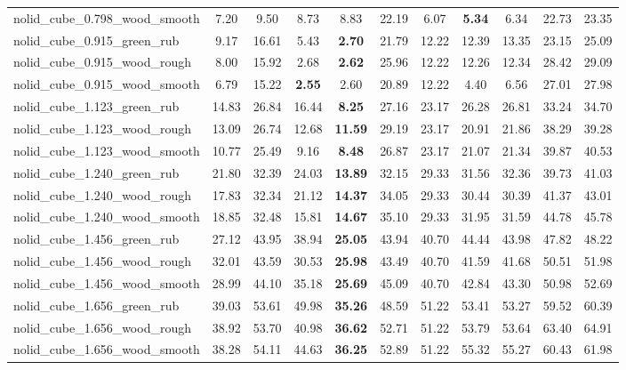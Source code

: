 \begin{table}[H]
{\begin{tabular}{l cccccccccc}
        nolid\_cube\_0.798\_wood\_smooth & 7.20 & 9.50 & 8.73 & 8.83 & 22.19 & 6.07 & \textbf{5.34} & 6.34 & 22.73 & 23.35 \\
        nolid\_cube\_0.915\_green\_rub & 9.17 & 16.61 & 5.43 & \textbf{2.70} & 21.79 & 12.22 & 12.39 & 13.35 & 23.15 & 25.09 \\
        nolid\_cube\_0.915\_wood\_rough & 8.00 & 15.92 & 2.68 & \textbf{2.62} & 25.96 & 12.22 & 12.26 & 12.34 & 28.42 & 29.09 \\
        nolid\_cube\_0.915\_wood\_smooth & 6.79 & 15.22 & \textbf{2.55} & 2.60 & 20.89 & 12.22 & 4.40 & 6.56 & 27.01 & 27.98 \\
        nolid\_cube\_1.123\_green\_rub & 14.83 & 26.84 & 16.44 & \textbf{8.25} & 27.16 & 23.17 & 26.28 & 26.81 & 33.24 & 34.70 \\
        nolid\_cube\_1.123\_wood\_rough & 13.09 & 26.74 & 12.68 & \textbf{11.59} & 29.19 & 23.17 & 20.91 & 21.86 & 38.29 & 39.28 \\
        nolid\_cube\_1.123\_wood\_smooth & 10.77 & 25.49 & 9.16 & \textbf{8.48} & 26.87 & 23.17 & 21.07 & 21.34 & 39.87 & 40.53 \\
        nolid\_cube\_1.240\_green\_rub & 21.80 & 32.39 & 24.03 & \textbf{13.89} & 32.15 & 29.33 & 31.56 & 32.36 & 39.73 & 41.03 \\
        nolid\_cube\_1.240\_wood\_rough & 17.83 & 32.34 & 21.12 & \textbf{14.37} & 34.05 & 29.33 & 30.44 & 30.39 & 41.37 & 43.01 \\
        nolid\_cube\_1.240\_wood\_smooth & 18.85 & 32.48 & 15.81 & \textbf{14.67} & 35.10 & 29.33 & 31.95 & 31.59 & 44.78 & 45.78 \\
        nolid\_cube\_1.456\_green\_rub & 27.12 & 43.95 & 38.94 & \textbf{25.05} & 43.94 & 40.70 & 44.44 & 43.98 & 47.82 & 48.22 \\
        nolid\_cube\_1.456\_wood\_rough & 32.01 & 43.59 & 30.53 & \textbf{25.98} & 43.49 & 40.70 & 41.59 & 41.68 & 50.51 & 51.98 \\
        nolid\_cube\_1.456\_wood\_smooth & 28.99 & 44.10 & 35.18 & \textbf{25.69} & 45.09 & 40.70 & 42.84 & 43.30 & 50.98 & 52.69 \\
        nolid\_cube\_1.656\_green\_rub & 39.03 & 53.61 & 49.98 & \textbf{35.26} & 48.59 & 51.22 & 53.41 & 53.27 & 59.52 & 60.39 \\
        nolid\_cube\_1.656\_wood\_rough & 38.92 & 53.70 & 40.98 & \textbf{36.62} & 52.71 & 51.22 & 53.79 & 53.64 & 63.40 & 64.91 \\
        nolid\_cube\_1.656\_wood\_smooth & 38.28 & 54.11 & 44.63 & \textbf{36.25} & 52.89 & 51.22 & 55.32 & 55.27 & 60.43 & 61.98 \\

\end{tabular}}
\end{table}
